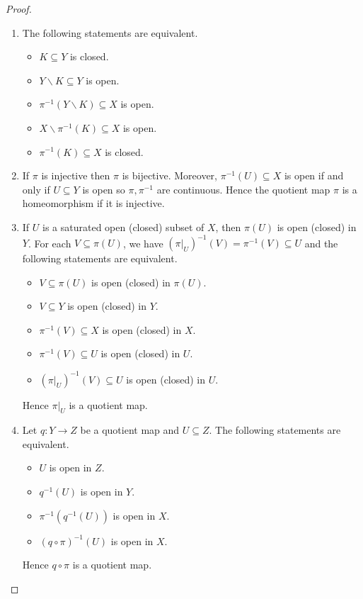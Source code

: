 \begin{proof}
\begin{enumerate}[itemsep=0pt,label={(\alph*)}]
              Hence \( f \) is a homeomorphism, which means \( \mathscr{T}_{1}, \mathscr{T}_{2} \) are identical.
        \item The following statements are equivalent.
              \begin{itemize}
                  \item \( K \subseteq Y \) is closed.
                  \item \( Y \smallsetminus K \subseteq Y \) is open.
                  \item \( \pi^{-1}(Y \smallsetminus K) \subseteq X \) is open.
                  \item \( X \smallsetminus \pi^{-1}(K) \subseteq X \) is open.
                  \item \( \pi^{-1}(K) \subseteq X \) is closed.
              \end{itemize}
        \item If \( \pi \) is injective then \( \pi \) is bijective. Moreover, \( \pi^{-1}(U) \subseteq X \) is open if and only if \( U \subseteq Y \) is open so \( \pi, \pi^{-1} \) are continuous. Hence the quotient map \( \pi \) is a homeomorphism if it is injective.
        \item If \( U \) is a saturated open (closed) subset of \( X \), then \( \pi(U) \) is open (closed) in \( Y \). For each \( V \subseteq \pi(U) \), we have \( {(\pi\vert_{U})}^{-1}(V) = \pi^{-1}(V) \subseteq U \) and the following statements are equivalent.
              \begin{itemize}
                  \item \( V \subseteq \pi(U) \) is open (closed) in \( \pi(U) \).
                  \item \( V \subseteq Y \) is open (closed) in \( Y \).
                  \item \( \pi^{-1}(V) \subseteq X \) is open (closed) in \( X \).
                  \item \( \pi^{-1}(V) \subseteq U \) is open (closed) in \( U \).
                  \item \( {(\pi\vert_{U})}^{-1}(V) \subseteq U \) is open (closed) in \( U \).
              \end{itemize}

              Hence \( \pi\vert_{U} \) is a quotient map.
        \item Let \( q: Y \to Z \) be a quotient map and \( U \subseteq Z \). The following statements are equivalent.
              \begin{itemize}
                  \item \( U \) is open in \( Z \).
                  \item \( q^{-1}(U) \) is open in \( Y \).
                  \item \( \pi^{-1}(q^{-1}(U)) \) is open in \( X \).
                  \item \( {(q \circ \pi)}^{-1}(U) \) is open in \( X \).
              \end{itemize}

              Hence \( q \circ \pi \) is a quotient map.
    \end{enumerate}
\end{proof}

